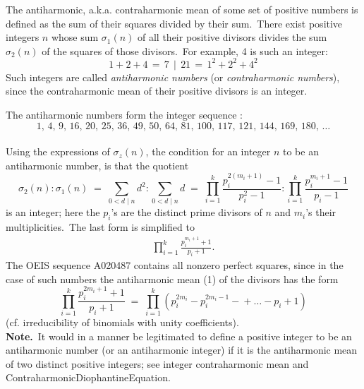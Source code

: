 \documentclass[12pt]{article}
\begin{document}
The antiharmonic, a.k.a. contraharmonic mean of some set of 
positive numbers is defined as the sum of their squares 
divided by their sum.\, There exist positive integers $n$ 
whose sum $\sigma_1(n)$ of all their positive divisors divides 
the sum $\sigma_2(n)$ of the squares of those divisors.\, For 
example, 4 is such an integer:
$$1+2+4 \,=\, 7 \,\mid\, 21 \,=\, 1^2+2^2+4^2$$
Such integers are called 
{\it antiharmonic numbers} (or {\it contraharmonic numbers}), 
since the contraharmonic mean of their positive divisors is an 
integer.
 
The antiharmonic numbers form the
 integer sequence
:
$$1,\,4,\,9,\,16,\,20,\,25,\,36,\,49,\,50,\,64,\,81,\,100,\,117,\,121,\,144,\,169,\,180,\,\ldots$$\\


Using the expressions of  
$\sigma_z(n)$, the condition for an 
integer $n$ to be an antiharmonic number, is that the quotient
$$\sigma_2(n):\sigma_1(n) 
\;=\; \sum_{0 < d \mid n}\!d^2:\!\sum_{0 < d \mid n}\!d
\;=\; \prod_{i=1}^k\frac{p_i^{2(m_i+1)}-1}{p_i^2-1}
     :\prod_{i=1}^k\frac{p_i^{m_i+1}-1}{p_i-1}$$
is an integer; here the $p_i$'s are the distinct prime divisors 
of $n$ and $m_i$'s their multiplicities.\, The last form is 
simplified to
\begin{align}
\prod_{i=1}^k\frac{p_i^{m_i+1}+1}{p_i+1}.
\end{align}
The OEIS sequence A020487 contains all nonzero perfect squares, 
since in the case of such numbers the antiharmonic mean (1) of 
the divisors has the form
$$\prod_{i=1}^k\frac{p_i^{2m_i+1}+1}{p_i+1} \;=\;
\prod_{i=1}^k\left(p_i^{2m_i}-p_i^{2m_i-1}-\!+\ldots-p_i+1\right)$$
(cf. irreducibility of binomials with unity coefficients).\\




\textbf{Note.}\, It would in a manner be legitimated to define 
a positive integer to be an antiharmonic number (or an 
antiharmonic integer) if it is the antiharmonic mean of two 
distinct positive integers; see integer contraharmonic mean 
and 
{ContraharmonicDiophantineEquation}.
\end{document}
